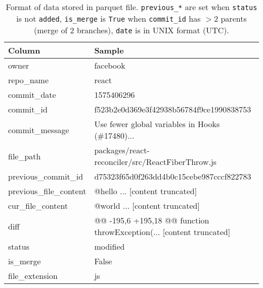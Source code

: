 \begin{table*}[ht!]
\footnotesize
\ttfamily
\centering
\begin{tabular}{|l|l|}
\hline
\textbf{Column}             & \textbf{Sample} \\ \hline
owner                       & facebook        \\ \hline
repo\_name                  & react        \\ \hline
commit\_date                & 1575406296         \\ \hline
commit\_id                  & f523b2e0d369e3f42938b56784f9ce1990838753        \\ \hline
commit\_message             & Use fewer global variables in Hooks (\#17480)...        \\ \hline
file\_path                  & packages/react-reconciler/src/ReactFiberThrow.js        \\ \hline
previous\_commit\_id        & d75323f65d0f263dd4b0c15cebe987cccf822783        \\ \hline
previous\_file\_content     & @hello ... [content truncated]        \\ \hline
cur\_file\_content          & @world ... [content truncated]        \\ \hline
diff                        & @@ -195,6 +195,18 @@ function throwException(... [content truncated]        \\ \hline
status                      & modified        \\ \hline
is\_merge                   & False          \\ \hline
file\_extension             & js        \\ \hline
\end{tabular}
\caption{Format of data stored in parquet file. \texttt{previous\_*} are set when \texttt{status} is not \texttt{added}, \texttt{is\_merge} is \texttt{True} when \texttt{commit\_id} has $>2$ parents (merge of 2 branches), \texttt{date} is in UNIX format (UTC).}
\label{tab:df_format}
\end{table*}



